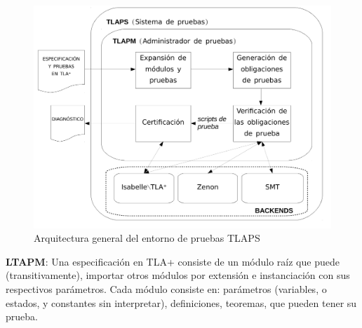 \documentclass[spanish]{llncs}
\begin{document}
\begin{figure}[H]
  \includegraphics[scale=0.4]{esquema-informe-ingsoft2}
  \caption{Arquitectura general del entorno de pruebas TLAPS}
\end{figure}

  \textbf{LTAPM}: Una especificación en TLA+ consiste de un módulo raíz que puede (transitivamente), importar otros módulos por extensión e instanciación con
  sus respectivos parámetros. Cada módulo consiste en: parámetros (variables, o estados, y constantes sin interpretar), definiciones, teoremas, que pueden tener su prueba.
  
\end{document}
